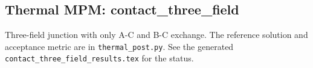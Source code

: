 \subsection{Thermal MPM: contact\_three\_field}
Three-field junction with only A-C and B-C exchange. The reference solution and acceptance metric are in \texttt{thermal\_post.py}. See the generated \texttt{contact\_three\_field\_results.tex} for the status.
